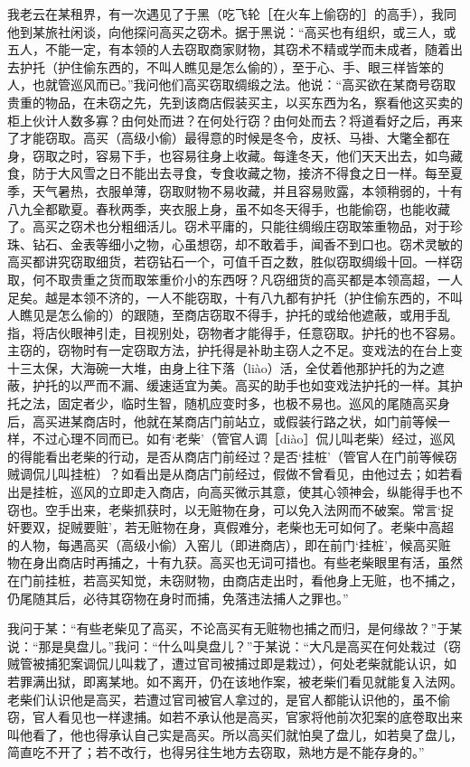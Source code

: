 \documentclass[12pt,UTF8]{ctexbook}
\begin{document}
我老云在某租界，有一次遇见了于黑（吃飞轮［在火车上偷窃的］的高手），我同他到某旅社闲谈，向他探问高买之窃术。据于黑说：“高买也有组织，或三人，或五人，不能一定，有本领的人去窃取商家财物，其窃术不精或学而未成者，随着出去护托（护住偷东西的，不叫人瞧见是怎么偷的），至于心、手、眼三样皆笨的人，也就管巡风而已。”我问他们高买窃取绸缎之法。他说：“高买欲在某商号窃取贵重的物品，在未窃之先，先到该商店假装买主，以买东西为名，察看他这买卖的柜上伙计人数多寡？由何处而进？在何处行窃？由何处而去？将道看好之后，再来了才能窃取。高买（高级小偷）最得意的时候是冬令，皮袄、马褂、大氅全都在身，窃取之时，容易下手，也容易往身上收藏。每逢冬天，他们天天出去，如鸟藏食，防于大风雪之日不能出去寻食，专食收藏之物，接济不得食之日一样。每至夏季，天气暑热，衣服单薄，窃取财物不易收藏，并且容易败露，本领稍弱的，十有八九全都歇夏。春秋两季，夹衣服上身，虽不如冬天得手，也能偷窃，也能收藏了。高买之窃术也分粗细活儿。窃术平庸的，只能往绸缎庄窃取笨重物品，对于珍珠、钻石、金表等细小之物，心虽想窃，却不敢着手，闻香不到口也。窃术灵敏的高买都讲究窃取细货，若窃钻石一个，可值千百之数，胜似窃取绸缎十回。一样窃取，何不取贵重之货而取笨重价小的东西呀？凡窃细货的高买都是本领高超，一人足矣。越是本领不济的，一人不能窃取，十有八九都有护托（护住偷东西的，不叫人瞧见是怎么偷的）的跟随，至商店窃取不得手，护托的或给他遮蔽，或用手乱指，将店伙眼神引走，目视别处，窃物者才能得手，任意窃取。护托的也不容易。主窃的，窃物时有一定窃取方法，护托得是补助主窃人之不足。变戏法的在台上变十三太保，大海碗一大堆，由身上往下落（liào）活，全仗着他那护托的为之遮蔽，护托的以严而不漏、缓速适宜为美。高买的助手也如变戏法护托的一样。其护托之法，固定者少，临时生智，随机应变时多，也极不易也。巡风的尾随高买身后，高买进某商店时，他就在某商店门前站立，或假装行路之状，如门前等候一样，不过心理不同而已。如有‘老柴’（管官人调［diào］侃儿叫老柴）经过，巡风的得能看出老柴的行动，是否从商店门前经过？是否‘挂桩’（管官人在门前等候窃贼调侃儿叫挂桩）？如看出是从商店门前经过，假做不曾看见，由他过去；如若看出是挂桩，巡风的立即走入商店，向高买微示其意，使其心领神会，纵能得手也不窃也。空手出来，老柴抓获时，以无赃物在身，可以免入法网而不破案。常言‘捉奸要双，捉贼要赃’，若无赃物在身，真假难分，老柴也无可如何了。老柴中高超的人物，每遇高买（高级小偷）入窑儿（即进商店），即在前门‘挂桩’，候高买赃物在身出商店时再捕之，十有九获。高买也无词可措也。有些老柴眼里有活，虽然在门前挂桩，若高买知觉，未窃财物，由商店走出时，看他身上无赃，也不捕之，仍尾随其后，必待其窃物在身时而捕，免落违法捕人之罪也。”

我问于某：“有些老柴见了高买，不论高买有无赃物也捕之而归，是何缘故？”于某说：“那是臭盘儿。”我问：“什么叫臭盘儿？”于某说：“大凡是高买在何处栽过（窃贼管被捕犯案调侃儿叫栽了，遭过官司被捕过即是栽过），何处老柴就能认识，如若罪满出狱，即离某地。如不离开，仍在该地作案，被老柴们看见就能复入法网。老柴们认识他是高买，若遭过官司被官人拿过的，是官人都能认识他的，虽不偷窃，官人看见也一样逮捕。如若不承认他是高买，官家将他前次犯案的底卷取出来叫他看了，他也得承认自己实是高买。所以高买们就怕臭了盘儿，如若臭了盘儿，简直吃不开了；若不改行，也得另往生地方去窃取，熟地方是不能存身的。”
\end{document}
